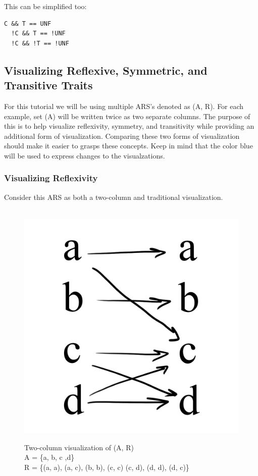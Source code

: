 \documentclass{article}
\begin{document}
{\medskip\noindent
This can be simplified too:

\begin{lstlisting}[style=CStyle]
  C && T == UNF
  !C && T == !UNF
  !C && !T == !UNF
\end{lstlisting}


\subsection{Visualizing Reflexive, Symmetric, and Transitive Traits}

\medskip\noindent
For this tutorial we will be using multiple ARS's denoted as (A, R). For each example, set (A) will be written twice as two separate columns. The purpose of this is to help visualize reflexivity, symmetry, and transitivity while providing an additional form of visualization. Comparing these two forms of visualization should make it easier to grasps these concepts. Keep in mind that the color blue will be used to express changes to the visualzations.

\subsubsection{Visualizing Reflexivity}

\medskip\noindent
Consider this ARS as both a two-column and traditional visualization.

\begin{figure}[h!]\
  \centering
  \includegraphics[scale=0.06]{s1}
  \caption[] {
     Two-column visualization of (A, R) \\ A = \{a, b, c ,d\} \\ R = \{(a, a), (a, c), (b, b), (c, c) (c, d), (d, d), (d, c)\}
    \endtabular}
\end{figure}

}
\end{document}
